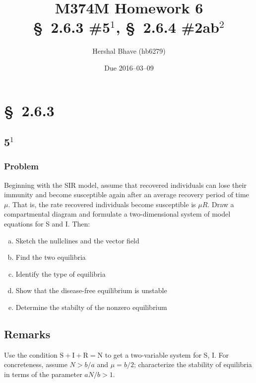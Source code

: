 \documentclass[12pt]{article}
\title{M374M Homework 6 \\
  \normalsize{\S~2.6.3 \#5$^1$, \S~2.6.4 \#2ab$^2$}}
\author{Hershal Bhave (hb6279)}
\date{Due 2016--03--09}
\begin{document}
\maketitle
\section{\S~2.6.3}
\subsection{5$^1$}
\subsubsection*{Problem}
Beginning with the SIR model, assume that recovered individuals can lose their
immunity and become susceptible again after an average recovery period of time
$\mu$. That is, the rate recovered individuals become susceptible is $\mu R$.
Draw a compartmental diagram and formulate a two-dimensional system of model
equations for S and I. Then:
\begin{enumerate}[(a)]
\item Sketch the nullclines and the vector field
\item Find the two equilibria
\item Identify the type of equilibria
\item Show that the disease-free equilibrium is unstable
\item Determine the stabilty of the nonzero equilibrium
\end{enumerate}

\subsection*{Remarks}
Use the condition $\text{S} + \text{I} + \text{R} = \text{N}$ to get a
two-variable system for S, I. For concreteness, assume $N>b/a$ and $\mu=b/2$;
characterize the stability of equilibria in terms of the parameter $aN/b>1$.
\end{document}
